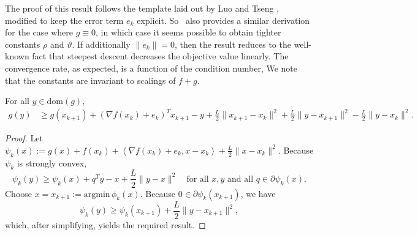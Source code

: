 The proof of this result follows the template laid out by Luo and
Tseng \cite[Theorem~3.1]{luo1993error}, modified to keep the error
term $e_k$ explicit. So~\cite{So:2013} also provides a similar
derivation for the case where $g\equiv0$, in which case it seems
possible to obtain tighter constants $\rho$ and $\vartheta$.  If
additionally $\|e_{k}\|=0$, then the result reduces to the well-known
fact that steepest descent decreases the objective value linearly. The
convergence rate, as expected, is a function of the condition number,
We
note that the constants are invariant to scalings of $f+g$.

\noindent 
\begin{lem} \label{le:3-points}
For all $y\in \text{dom}(g)$,
\begin{align*}
  g(y) &\geq g(x_{k+1})
  +{(\nabla f(x_{k})+e_{k})}^T{x_{k+1}-y}
 +\frac{L}{2}\|x_{k+1}-x_{k}\|^{2}
 +\frac{L}{2}\|y-x_{k+1}\|^{2}-\frac{L}{2}\|y-x_{k}\|^{2}.
\end{align*}
\end{lem}

\begin{proof}
Let $\psi_{k}(x) := g(x)+f(x_{k})+\left\langle \nabla
  f(x_{k})+e_{k},x-x_{k}\right\rangle +\frac{L}{2}\|x-x_{k}\|^{2}$. 
Because $\psi_{k}$ is strongly convex,
\[
  \psi_{k}(y)\geq\psi_{k}(x)
  + {q^T}{y-x}
  + \frac{L}{2}\|y-x\|^{2}
  \quad\mbox{for all $x,y$ and all $q\in\partial\psi_k(x)$.}
\]
Choose $x=x_{k+1}:=\text{argmin}\,\phi_{k}(x)$. Because
$0\in\partial\psi_k(x_{k+1})$, we have
$$\psi_{k}(y)\geq\psi_{k}(x_{k+1})+\frac{L}{2}\|y-x_{k+1}\|^{2},$$
which, after simplifying, yields the required result.
\end{proof}


